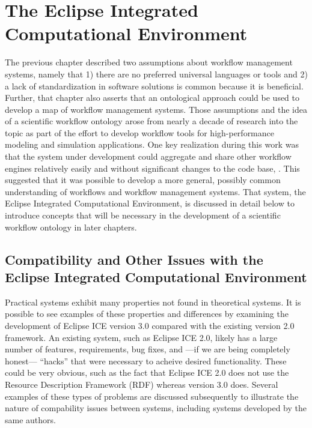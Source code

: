 \chapter{The Eclipse Integrated Computational Environment} \label{ch:eclipse-ice}

The previous chapter described two assumptions about workflow management
systems, namely that 1) there are no preferred universal languages or tools
and 2) a lack of standardization in software solutions is common because it is
beneficial. Further, that chapter also asserts that an ontological approach
could be used to develop a map of workflow management systems. Those assumptions
and the idea of a scientific workflow ontology arose from nearly a decade of
research into the topic as part of the effort to develop workflow tools for
high-performance modeling and simulation applications. One key realization
during this work was that the system under development could aggregate and share
other workflow engines relatively easily and without significant changes to the
code base, \cite{brooks_introducing_2016}. This suggested that it was possible
to develop a more general, possibly common understanding of workflows and
workflow management systems. That system, the Eclipse Integrated Computational
Environment, is discussed in detail below to introduce concepts that will be
necessary in the development of a scientific workflow ontology in later
chapters.


\section{Compatibility and Other Issues with the Eclipse Integrated
Computational Environment}


Practical systems exhibit many properties not found in theoretical systems. It
is possible to see examples of these properties and differences by examining the
development of Eclipse ICE version 3.0 compared with the existing version 2.0
framework. An existing system, such as Eclipse ICE 2.0, likely has a large
number of features, requirements, bug fixes, and ---if we are being completely
honest--- ``hacks'' that were necessary to acheive desired functionality. These
could be very obvious, such as the fact that Eclipse ICE 2.0 does not use the Resource
Description Framework (RDF) whereas version 3.0 does. Several examples of these
types of problems are discussed subsequently to illustrate the nature of
compability issues between systems, including systems developed by the same authors.

